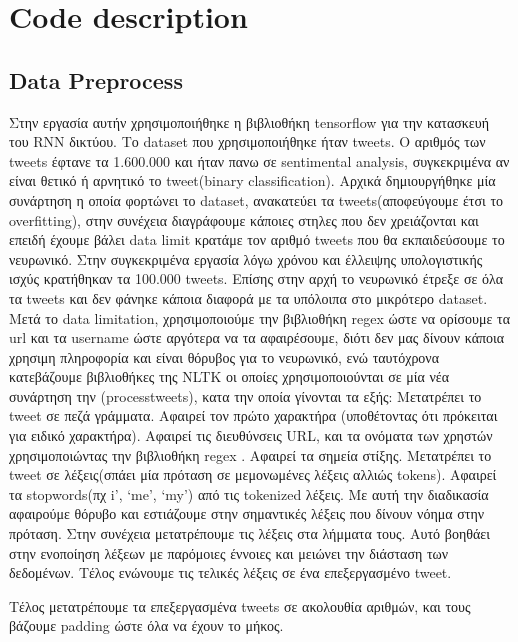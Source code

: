 \section{Code description}

\subsection{Data Preprocess}
Στην εργασία αυτήν χρησιμοποιήθηκε η βιβλιοθήκη tensorflow για την κατασκευή του RNN δικτύου. Το dataset που χρησιμοποιήθηκε ήταν tweets. Ο αριθμός των tweets έφτανε τα 1.600.000 και ήταν πανω σε sentimental analysis, συγκεκριμένα αν είναι θετικό ή αρνητικό το tweet(binary classification).
Αρχικά δημιουργήθηκε μία συνάρτηση η οποία φορτώνει το dataset, ανακατεύει τα tweets(αποφεύγουμε έτσι το overfitting), στην συνέχεια διαγράφουμε κάποιες στηλες που δεν χρειάζονται και επειδή έχουμε βάλει data limit κρατάμε τον αριθμό tweets που θα εκπαιδεύσουμε το νευρωνικό.
Στην συγκεκριμένα εργασία λόγω χρόνου και έλλειψης υπολογιστικής ισχύς κρατήθηκαν τα 100.000 tweets. Επίσης στην αρχή το νευρωνικό έτρεξε σε όλα τα tweets και δεν φάνηκε κάποια διαφορά με τα υπόλοιπα στο μικρότερο dataset. Μετά το data limitation, χρησιμοποιούμε την βιβλιοθήκη regex ώστε να ορίσουμε τα url και τα username ώστε αργότερα να τα αφαιρέσουμε, διότι δεν μας δίνουν κάποια χρησιμη πληροφορία και είναι θόρυβος για το νευρωνικό, ενώ ταυτόχρονα κατεβάζουμε βιβλιοθήκες της NLTK οι οποίες χρησιμοποιούνται σε μία νέα συνάρτηση την (processtweets), κατα την οποία γίνονται τα εξής:
Μετατρέπει το tweet σε πεζά γράμματα.
Αφαιρεί τον πρώτο χαρακτήρα (υποθέτοντας ότι πρόκειται για ειδικό χαρακτήρα).
Αφαιρεί τις διευθύνσεις URL, και τα ονόματα των χρηστών χρησιμοποιώντας την βιβλιοθήκη regex .
Αφαιρεί τα σημεία στίξης.
Μετατρέπει το tweet σε λέξεις(σπάει μία πρόταση σε μεμονωμένες λέξεις αλλιώς tokens).
Αφαιρεί τα stopwords(πχ i’, ‘me’, ‘my’) από τις tokenized λέξεις. Με αυτή την διαδικασία αφαιρούμε θόρυβο και εστιάζουμε στην σημαντικές λέξεις που δίνουν νόημα στην πρόταση.
Στην συνέχεια μετατρέπουμε τις λέξεις στα λήμματα τους. Αυτό βοηθάει στην ενοποίηση λέξεων με παρόμοιες έννοιες και μειώνει την διάσταση των δεδομένων.
Τέλος ενώνουμε τις τελικές λέξεις σε ένα επεξεργασμένο tweet.

Τέλος μετατρέπουμε τα επεξεργασμένα tweets σε ακολουθία αριθμών, και τους βάζουμε padding ώστε όλα να έχουν το μήκος.




